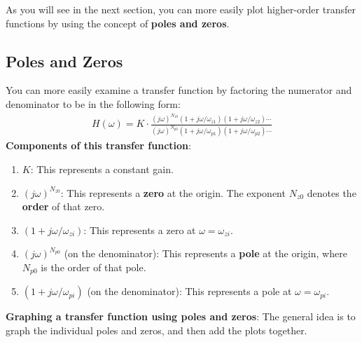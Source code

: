 \begin{enumerate}
\end{enumerate}
As you will see in the next section, you can more easily plot higher-order transfer functions by using the concept of \textbf{poles and zeros}.

\newpage
\subsection*{Poles and Zeros}
You can more easily examine a transfer function by factoring the numerator and denominator to be in the following form:
\begin{align*}
    H(\omega) = K \cdot \frac{(j\omega)^{N_{z0}} (1 + j\omega/\omega_{z1}) (1 + j\omega/\omega_{z2}) \cdots}{(j\omega)^{N_{p0}} (1 + j\omega/\omega_{p1}) (1 + j\omega/\omega_{p2}) \cdots}
\end{align*}
\textbf{Components of this transfer function}:
\begin{enumerate}
    \item $K$: This represents a constant gain.
    \item $(j\omega)^{N_{z0}}$: This represents a \textbf{zero} at the origin. The exponent $N_{z0}$ denotes the \textbf{order} of that zero.
    \item $(1 + j\omega/\omega_{zi})$: This represents a zero at $\omega = \omega_{zi}$.
    \item $(j\omega)^{N_{p0}}$ (on the denominator): This represents a \textbf{pole} at the origin, where $N_{p0}$ is the order of that pole.
    \item $(1 + j\omega/\omega_{pi})$ (on the denominator): This represents a pole at $\omega = \omega_{pi}$.
\end{enumerate}

\textbf{Graphing a transfer function using poles and zeros}: The general idea is to graph the individual poles and zeros, and then add the plots together.

